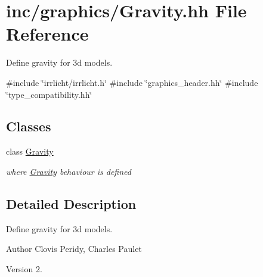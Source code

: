 \hypertarget{Gravity_8hh}{}\section{inc/graphics/\+Gravity.hh File Reference}
\label{Gravity_8hh}


Define gravity for 3d models.  


{\ttfamily \#include \char`\"{}irrlicht/irrlicht.\+h\char`\"{}}\newline
{\ttfamily \#include \char`\"{}graphics\+\_\+header.\+hh\char`\"{}}\newline
{\ttfamily \#include \char`\"{}type\+\_\+compatibility.\+hh\char`\"{}}\newline
\subsection*{Classes}
\begin{DoxyCompactItemize}
\item 
class \hyperlink{classGravity}{Gravity}
\begin{DoxyCompactList}\small\item\em where \hyperlink{classGravity}{Gravity} behaviour is defined \end{DoxyCompactList}\end{DoxyCompactItemize}


\subsection{Detailed Description}
Define gravity for 3d models. 

\begin{DoxyAuthor}{Author}
Clovis Peridy, Charles Paulet 
\end{DoxyAuthor}
\begin{DoxyVersion}{Version}
2. 
\end{DoxyVersion}
